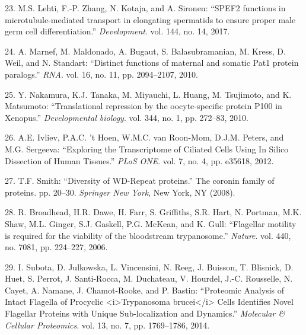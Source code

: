 \documentclass[12pt,twoside]{reedthesis}
\theoremstyle{definition}
\theoremstyle{definition}
\theoremstyle{remark}
\begin{document}
  \hypertarget{ref-Lehti2017}{}
  23. M.S. Lehti, F.-P. Zhang, N. Kotaja, and A. Sironen: ``SPEF2
  functions in microtubule-mediated transport in elongating spermatids to
  ensure proper male germ cell differentiation.'' \emph{Development}. vol.
  144, no. 14, 2017.
  
  \hypertarget{ref-Marnef2010}{}
  24. A. Marnef, M. Maldonado, A. Bugaut, S. Balasubramanian, M. Kress, D.
  Weil, and N. Standart: ``Distinct functions of maternal and somatic Pat1
  protein paralogs.'' \emph{RNA}. vol. 16, no. 11, pp. 2094--2107, 2010.
  
  \hypertarget{ref-Nakamura2010}{}
  25. Y. Nakamura, K.J. Tanaka, M. Miyauchi, L. Huang, M. Tsujimoto, and
  K. Matsumoto: ``Translational repression by the oocyte-specific protein
  P100 in Xenopus.'' \emph{Developmental biology}. vol. 344, no. 1, pp.
  272--83, 2010.
  
  \hypertarget{ref-Ivliev2012}{}
  26. A.E. Ivliev, P.A.C. 't Hoen, W.M.C. van Roon-Mom, D.J.M. Peters, and
  M.G. Sergeeva: ``Exploring the Transcriptome of Ciliated Cells Using In
  Silico Dissection of Human Tissues.'' \emph{PLoS ONE}. vol. 7, no. 4,
  pp. e35618, 2012.
  
  \hypertarget{ref-Smith2008}{}
  27. T.F. Smith: ``Diversity of WD-Repeat proteins.'' The coronin family
  of proteins. pp. 20--30. \emph{Springer New York}, New York, NY (2008).
  
  \hypertarget{ref-Broadhead2006}{}
  28. R. Broadhead, H.R. Dawe, H. Farr, S. Griffiths, S.R. Hart, N.
  Portman, M.K. Shaw, M.L. Ginger, S.J. Gaskell, P.G. McKean, and K. Gull:
  ``Flagellar motility is required for the viability of the bloodstream
  trypanosome.'' \emph{Nature}. vol. 440, no. 7081, pp. 224--227, 2006.
  
  \hypertarget{ref-Subota2014}{}
  29. I. Subota, D. Julkowska, L. Vincensini, N. Reeg, J. Buisson, T.
  Blisnick, D. Huet, S. Perrot, J. Santi-Rocca, M. Duchateau, V. Hourdel,
  J.-C. Rousselle, N. Cayet, A. Namane, J. Chamot-Rooke, and P. Bastin:
  ``Proteomic Analysis of Intact Flagella of Procyclic
  \textless{}i\textgreater{}Trypanosoma brucei\textless{}/i\textgreater{}
  Cells Identifies Novel Flagellar Proteins with Unique Sub-localization
  and Dynamics.'' \emph{Molecular \& Cellular Proteomics}. vol. 13, no. 7,
  pp. 1769--1786, 2014.


\end{document}
